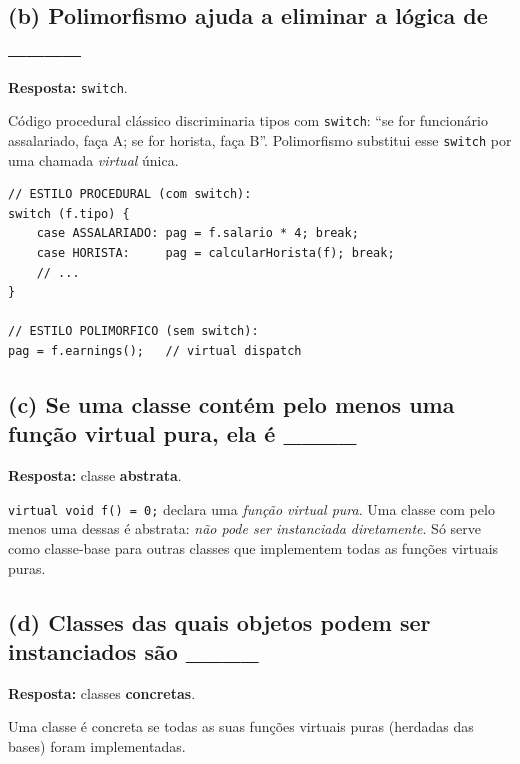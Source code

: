 \documentclass[11pt,a4paper]{article}
\begin{document}
\subsection*{(b) Polimorfismo ajuda a eliminar a l\'ogica de \_\_\_\_}

\begin{resposta}\textbf{Resposta:} \texttt{switch}.\end{resposta}

C\'odigo procedural cl\'assico discriminaria tipos com \texttt{switch}: ``se for funcion\'ario assalariado, fa\c{c}a A; se for horista, fa\c{c}a B''. Polimorfismo substitui esse \texttt{switch} por uma chamada \emph{virtual} \'unica.

\begin{lstlisting}[style=cppcode,numbers=none]
// ESTILO PROCEDURAL (com switch):
switch (f.tipo) {
    case ASSALARIADO: pag = f.salario * 4; break;
    case HORISTA:     pag = calcularHorista(f); break;
    // ...
}

// ESTILO POLIMORFICO (sem switch):
pag = f.earnings();   // virtual dispatch
\end{lstlisting}

\subsection*{(c) Se uma classe cont\'em pelo menos uma fun\c{c}\~ao virtual pura, ela \'e \_\_\_\_}

\begin{resposta}\textbf{Resposta:} classe \textbf{abstrata}.\end{resposta}

\texttt{virtual void f() = 0;} declara uma \emph{fun\c{c}\~ao virtual pura}. Uma classe com pelo menos uma dessas \'e abstrata: \emph{n\~ao pode ser instanciada diretamente}. S\'o serve como classe-base para outras classes que implementem todas as fun\c{c}\~oes virtuais puras.

\subsection*{(d) Classes das quais objetos podem ser instanciados s\~ao \_\_\_\_}

\begin{resposta}\textbf{Resposta:} classes \textbf{concretas}.\end{resposta}

Uma classe \'e concreta se todas as suas fun\c{c}\~oes virtuais puras (herdadas das bases) foram implementadas.
\end{document}
